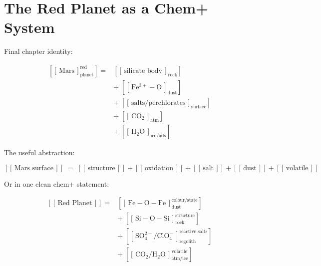 \documentclass[11pt,a4paper]{article}
\newcommand{\cid}[3]{\!\left[\!\left[\,#1\,\right]^{\!#2}_{\!#3}\!\right]}
\newcommand{\cidb}[2]{\!\left[\!\left[\,#1\,\right]_{\!#2}\!\right]}
\newcommand{\cidn}[1]{\!\left[\!\left[\,#1\,\right]\!\right]}
\begin{document}
\section{The Red Planet as a Chem+ System}

Final chapter identity:

\begin{keybox}
\begin{align*}
\cid{\mathrm{Mars}}{\text{red}}{\text{planet}}
={}&\cidb{\text{silicate body}}{\text{rock}}\\
&+\;\cidb{\mathrm{Fe^{3+}{-}O}}{\text{dust}}\\
&+\;\cidb{\text{salts/perchlorates}}{\text{surface}}\\
&+\;\cidb{\mathrm{CO_2}}{\text{atm}}\\
&+\;\cidb{\mathrm{H_2O}}{\text{ice/ads}}
\end{align*}
\end{keybox}

The useful abstraction:

\[
\cidn{\text{Mars surface}}
\;=\;
\cidn{\text{structure}}
+\cidn{\text{oxidation}}
+\cidn{\text{salt}}
+\cidn{\text{dust}}
+\cidn{\text{volatile}}
\]

Or in one clean chem+ statement:

\begin{keybox}
\begin{align*}
\cidn{\text{Red Planet}}
={}&
  \cid{\mathrm{Fe{-}O{-}Fe}}{\text{colour/state}}{\text{dust}}\\
&+\;\cid{\mathrm{Si{-}O{-}Si}}{\text{structure}}{\text{rock}}\\
&+\;\cid{\mathrm{SO_4^{2-}/ClO_4^-}}{\text{reactive salts}}{\text{regolith}}\\
&+\;\cid{\mathrm{CO_2/H_2O}}{\text{volatile}}{\text{atm/ice}}
\end{align*}
\end{keybox}
\end{document}
